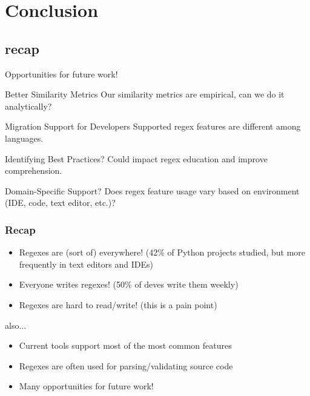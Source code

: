 \section{Conclusion}
\subsection{recap}


\begin{frame}{Opportunities for future work!}

\begin{block}{Better Similarity Metrics}
Our similarity metrics are empirical, can we do it analytically?
\end{block}



\begin{block}{Migration Support for Developers}
Supported regex features are different among languages.
\end{block}


\begin{block}{Identifying Best Practices?}
Could impact regex education and improve comprehension. 
\end{block}


\begin{block}{Domain-Specific Support?}
Does regex feature usage vary based on environment (IDE, code, text editor, etc.)?
\end{block}



\end{frame}

\begin{frame}
\frametitle{Recap}

\begin{itemize}
\item Regexes are (sort of) everywhere! (42\% of Python projects studied, but more frequently in text editors and IDEs)
\item<2-> Everyone writes regexes! (50\% of  deves write them weekly)
\item<3-> Regexes are hard to read/write! (this is a pain point)
\end{itemize}

also...

\begin{itemize}
\item Current tools support most of the most common features
\item Regexes are often used for parsing/validating source code 
\item Many opportunities for future work!
\end{itemize}


\end{frame}


